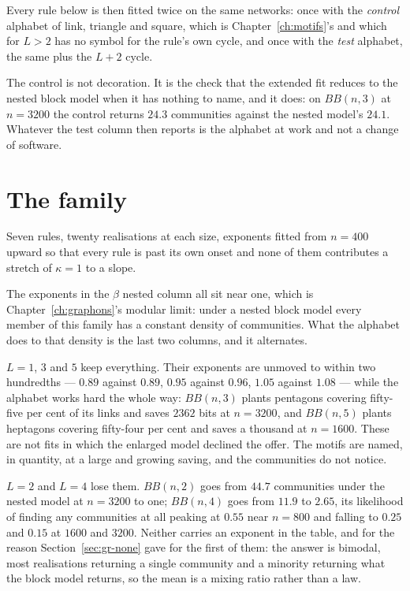 Every rule below is then fitted twice on the same networks: once with the
\emph{control} alphabet of link, triangle and square, which is
Chapter~\ref{ch:motifs}'s and which for $L>2$ has no symbol for the rule's own
cycle, and once with the \emph{test} alphabet, the same plus the $L+2$ cycle.

The control is not decoration. It is the check that the extended fit
reduces to the nested block model when it has nothing to name, and it does: on
$BB(n,3)$ at $n=3200$ the control returns $24.3$ communities against the nested
model's $24.1$. Whatever the test column then reports is the alphabet at work and
not a change of software.

\section{The family}
\label{sec:bb-family}

Seven rules, twenty realisations at each size, exponents fitted from $n=400$
upward so that every rule is past its own onset and none of them contributes a
stretch of $\kappa=1$ to a slope.



\noindent The exponents in the $\beta$ nested column all sit near one, which is
Chapter~\ref{ch:graphons}'s modular limit: under a nested block model every
member of this family has a constant density of communities. What the alphabet
does to that density is the last two columns, and it alternates.

$L=1$, $3$ and $5$ keep everything. Their exponents are unmoved to within two
hundredths --- $0.89$ against $0.89$, $0.95$ against $0.96$, $1.05$ against
$1.08$ --- while the alphabet works hard the whole way: $BB(n,3)$ plants pentagons
covering fifty-five per cent of its links and saves $2362$ bits at $n=3200$, and
$BB(n,5)$ plants heptagons covering fifty-four per cent and saves a thousand at
$n=1600$. These are not fits in which the enlarged model declined the offer. The
motifs are named, in quantity, at a large and growing saving, and the communities
do not notice.

$L=2$ and $L=4$ lose them. $BB(n,2)$ goes from $44.7$ communities under the
nested model at $n=3200$ to one; $BB(n,4)$ goes from $11.9$ to $2.65$, its
likelihood of finding any communities at all peaking at $0.55$ near $n=800$ and
falling to $0.25$ and $0.15$ at $1600$ and $3200$. Neither carries an exponent in
the table, and for the reason Section~\ref{sec:gr-none} gave for the first of
them: the answer is bimodal, most realisations returning a single community and a
minority returning what the block model returns, so the mean is a mixing ratio
rather than a law.

